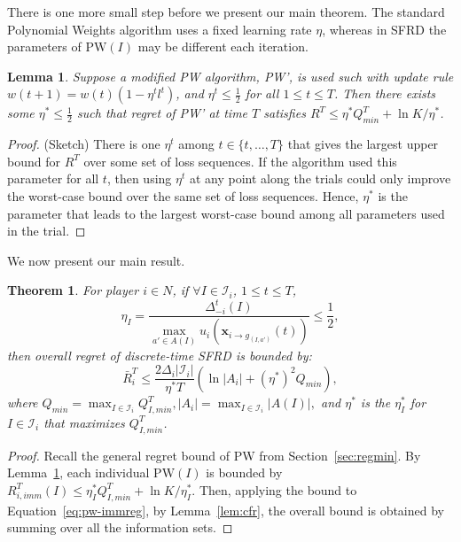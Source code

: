 \documentclass{aamas2014}
\newcommand{\bx}{\mathbf{x}}
\newcommand{\cI}{\mathcal{I}}
\newcommand{\PW}{\mbox{PW}}
\newtheorem{theorem}{Theorem}
\newtheorem{lemma}{Lemma}
\begin{document}
There is one more small step before we present our main theorem. The standard Polynomial Weights algorithm uses a fixed 
learning rate $\eta$, whereas in SFRD the parameters of $\PW(I)$ may be different each iteration. 

\begin{lemma}
\label{lem:diffrates}
Suppose a modified PW algorithm, PW', is used such with update rule $w(t+1) = w(t)(1 - \eta^t l^t)$, and 
$\eta^t \le \frac{1}{2}$ for all $1 \le t \le T$. Then there exists some $\eta^* \le \frac{1}{2}$ such that regret of PW' 
at time $T$ satisfies $R^T \le \eta^* Q^T_{min} + \ln K / {\eta^*}$.
\end{lemma}
\begin{proof}(Sketch)
There is one $\eta^t$ among $t \in \{ t, \ldots, T \}$ that gives the largest upper bound for $R^T$ over some set of 
loss sequences. If the algorithm used this parameter for all $t$, then using $\eta^t$ at any point 
along the trials could only improve the worst-case bound over the same set of loss sequences. 
Hence, $\eta^*$ is the parameter that leads to the largest 
worst-case bound among all parameters used in the trial. 
\end{proof}

\noindent We now present our main result. %



\begin{theorem}
\label{thm:main}
For player $i \in N$, if $\forall I \in \cI_i$, $1 \le t \le T$,
\[ 
\eta_I = \frac{\Delta^t_{-i}(I)}{\max_{a' \in A(I)} u_i(\bx_{i \rightarrow g_{(I,a')}}(t))} \le \frac{1}{2}, 
\]
then overall regret of discrete-time SFRD is bounded by: 
\[
\bar{R}^T_i \le \frac{2 \Delta_i |\cI_i|}{\eta^* T} \left( \ln{|A_i|} + (\eta^*)^2 Q_{min}  \right), 
\]
where $Q_{min} = \max_{I \in \cI_i} Q^T_{I,min}, |A_i| = \max_{I \in \cI_i}|A(I)|,$ and $\eta^*$ is the $\eta^*_I$ for $I \in \cI_i$ 
that maximizes $Q^T_{I,min}$. 
\end{theorem}
\begin{proof}
Recall the general regret bound of PW from Section~\ref{sec:regmin}. By Lemma~\ref{lem:diffrates}, each individual $\PW(I)$ is 
bounded by $R^T_{i,imm}(I) \le \eta^*_I Q^T_{I,min} + \ln K / \eta^*_I$. Then, applying the bound to Equation~\ref{eq:pw-immreg}, by Lemma~\ref{lem:cfr}, the overall bound is obtained by summing over all the information sets. 
\end{proof}
\end{document}
